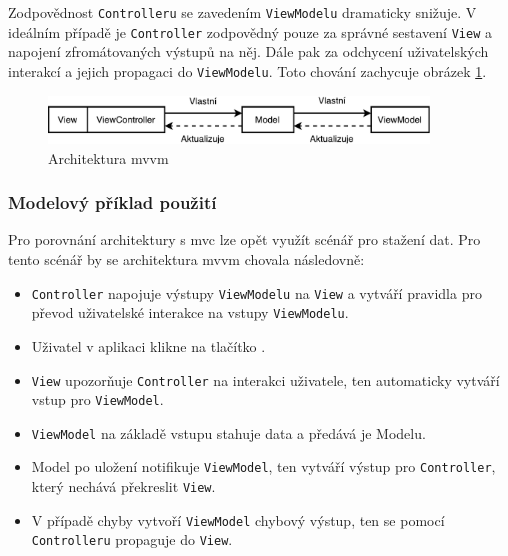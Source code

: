 
Zodpovědnost \texttt{Controlleru} se zavedením \texttt{ViewModelu} dramaticky snižuje.
V ideálním případě je \texttt{Controller} zodpovědný pouze za správné sestavení \texttt{View} a napojení zfromátovaných výstupů na něj.
Dále pak za odchycení uživatelských interakcí a jejich propagaci do \texttt{ViewModelu}.
Toto chování zachycuje obrázek \ref{architektura-mvvm}.

\begin{figure}\centering
	\includegraphics[width=0.9\textwidth]{assets/analysis-mvvm-architecture.pdf}
	\caption[Architektura \acrshort{mvvm}]{Architektura \acrshort{mvvm}}\label{architektura-mvvm}
\end{figure}

\subsubsection*{Modelový příklad použití} \label{architektura-mvvm-priklad}

Pro porovnání architektury s \acrshort{mvc} lze opět využít scénář pro stažení dat.
Pro tento scénář by se architektura \acrshort{mvvm} chovala následovně:
\begin{itemize}
  \item \texttt{Controller} napojuje výstupy \texttt{ViewModelu} na \texttt{View} a vytváří pravidla pro převod uživatelské interakce na vstupy \texttt{ViewModelu}.
  \item Uživatel v aplikaci klikne na tlačítko .
  \item \texttt{View} upozorňuje \texttt{Controller} na interakci uživatele, ten automaticky vytváří vstup pro \texttt{ViewModel}.
  \item \texttt{ViewModel} na základě vstupu stahuje data a předává je Modelu.
  \item Model po uložení notifikuje \texttt{ViewModel}, ten vytváří výstup pro \texttt{Controller}, který nechává překreslit \texttt{View}.
  \item V případě chyby vytvoří \texttt{ViewModel} chybový výstup, ten se pomocí \texttt{Controlleru} propaguje do \texttt{View}.
\end{itemize}

